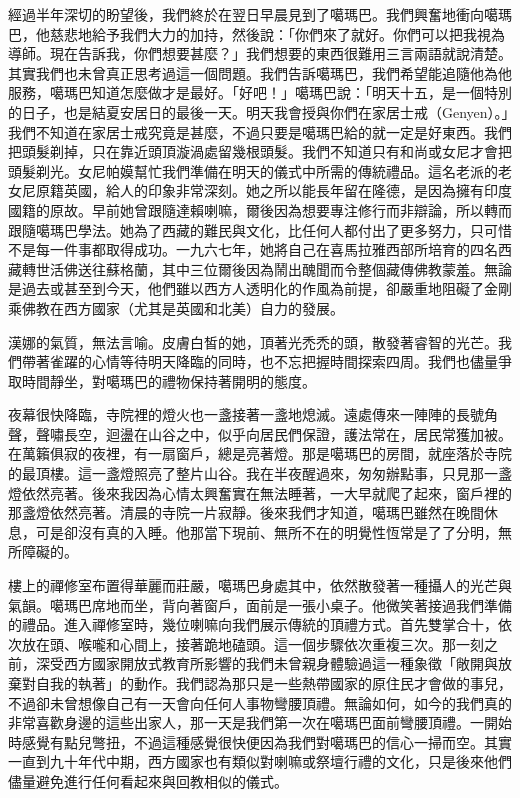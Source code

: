 經過半年深切的盼望後，我們終於在翌日早晨見到了噶瑪巴。我們興奮地衝向噶瑪巴，他慈悲地給予我們大力的加持，然後說：「你們來了就好。你們可以把我視為導師。現在告訴我，你們想要甚麼？」我們想要的東西很難用三言兩語就說清楚。其實我們也未曾真正思考過這一個問題。我們告訴噶瑪巴，我們希望能追隨他為他服務，噶瑪巴知道怎麼做才是最好。「好吧！」噶瑪巴說：「明天十五，是一個特別的日子，也是結夏安居日的最後一天。明天我會授與你們在家居士戒（Genyen）。」我們不知道在家居士戒究竟是甚麼，不過只要是噶瑪巴給的就一定是好東西。我們把頭髮剃掉，只在靠近頭頂漩渦處留幾根頭髮。我們不知道只有和尚或女尼才會把頭髮剃光。女尼帕嫫幫忙我們準備在明天的儀式中所需的傳統禮品。這名老派的老女尼原籍英國，給人的印象非常深刻。她之所以能長年留在隆德，是因為擁有印度國籍的原故。早前她曾跟隨達賴喇嘛，爾後因為想要專注修行而非辯論，所以轉而跟隨噶瑪巴學法。她為了西藏的難民與文化，比任何人都付出了更多努力，只可惜不是每一件事都取得成功。一九六七年，她將自己在喜馬拉雅西部所培育的四名西藏轉世活佛送往蘇格蘭，其中三位爾後因為鬧出醜聞而令整個藏傳佛教蒙羞。無論是過去或甚至到今天，他們雖以西方人透明化的作風為前提，卻嚴重地阻礙了金剛乘佛教在西方國家（尤其是英國和北美）自力的發展。

漢娜的氣質，無法言喻。皮膚白皙的她，頂著光禿禿的頭，散發著睿智的光芒。我們帶著雀躍的心情等待明天降臨的同時，也不忘把握時間探索四周。我們也儘量爭取時間靜坐，對噶瑪巴的禮物保持著開明的態度。

夜幕很快降臨，寺院裡的燈火也一盞接著一盞地熄滅。遠處傳來一陣陣的長號角聲，聲嘯長空，迴盪在山谷之中，似乎向居民們保證，護法常在，居民常獲加被。在萬籟俱寂的夜裡，有一扇窗戶，總是亮著燈。那是噶瑪巴的房間，就座落於寺院的最頂樓。這一盞燈照亮了整片山谷。我在半夜醒過來，匆匆辦點事，只見那一盞燈依然亮著。後來我因為心情太興奮實在無法睡著，一大早就爬了起來，窗戶裡的那盞燈依然亮著。清晨的寺院一片寂靜。後來我們才知道，噶瑪巴雖然在晚間休息，可是卻沒有真的入睡。他那當下現前、無所不在的明覺性恆常是了了分明，無所障礙的。

樓上的禪修室布置得華麗而莊嚴，噶瑪巴身處其中，依然散發著一種攝人的光芒與氣韻。噶瑪巴席地而坐，背向著窗戶，面前是一張小桌子。他微笑著接過我們準備的禮品。進入禪修室時，幾位喇嘛向我們展示傳統的頂禮方式。首先雙掌合十，依次放在頭、喉嚨和心間上，接著跪地磕頭。這一個步驟依次重複三次。那一刻之前，深受西方國家開放式教育所影響的我們未曾親身體驗過這一種象徵「敞開與放棄對自我的執著」的動作。我們認為那只是一些熱帶國家的原住民才會做的事兒，不過卻未曾想像自己有一天會向任何人事物彎腰頂禮。無論如何，如今的我們真的非常喜歡身邊的這些出家人，那一天是我們第一次在噶瑪巴面前彎腰頂禮。一開始時感覺有點兒彆扭，不過這種感覺很快便因為我們對噶瑪巴的信心一掃而空。其實一直到九十年代中期，西方國家也有類似對喇嘛或祭壇行禮的文化，只是後來他們儘量避免進行任何看起來與回教相似的儀式。

